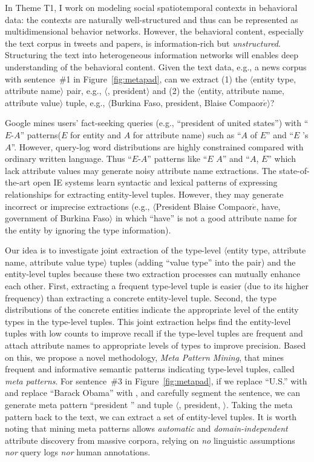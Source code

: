 \documentclass[10.5pt]{article}
\newcommand{\lb}{\mbox{$\langle$}}
\newcommand{\rb}{\mbox{$\rangle$}}
\newcommand{\pair}[2]{{\lb#1, #2\rb}\xspace}
\newcommand{\tuple}[3]{{\lb#1, #2, #3\rb}\xspace}
\newcommand{\eapatterns}{{``$E$-$A$'' patterns}\xspace}
\begin{document}
In Theme T1, I work on modeling social spatiotemporal contexts in behavioral data: the contexts are naturally well-structured and thus can be represented as multidimensional behavior networks. However, the behavioral content, especially the text corpus in tweets and papers, is information-rich but \textit{unstructured}. Structuring the text into heterogeneous information networks will enables deep understanding of the behavioral content. Given the text data, e.g., a news corpus with sentence~\#1 in Figure~\ref{fig:metapad}, can we extract (1) the \pair{entity type}{attribute name} pair, e.g., \pair{\cscountry}{president} and (2) the \tuple{entity}{attribute name}{attribute value} tuple, e.g., \tuple{Burkina Faso}{president}{Blaise Compaor$\acute{e}$}?

Google mines users' fact-seeking queries (e.g., ``president of united states'') with \eapatterns ($E$ for entity and $A$ for attribute name) such as ``$A$ of $E$'' and ``$E$ 's $A$''. However, query-log word distributions are highly constrained compared with ordinary written language. Thus \eapatterns like ``$E$ $A$'' and ``$A$, $E$'' which lack attribute values may generate noisy attribute name extractions. The state-of-the-art open IE systems learn syntactic and lexical patterns of expressing relationships for extracting entity-level tuples. However, they may generate incorrect or imprecise extractions (e.g., \tuple{President Blaise Compaor$\acute{e}$}{have}{government of Burkina Faso} in which ``have'' is not a good attribute name for the entity by ignoring the type information).

Our idea is to investigate joint extraction of the type-level \tuple{entity type}{attribute name}{attribute value type} tuples (adding ``value type'' into the pair) and the entity-level tuples because these two extraction processes can mutually enhance each other. First, extracting a frequent type-level tuple is easier (due to its higher frequency) than extracting a concrete entity-level tuple. Second, the type distributions of the concrete entities indicate the appropriate level of the entity types in the type-level tuples. This joint extraction helps find the entity-level tuples with low counts to improve recall if the type-level tuples are frequent and attach attribute names to appropriate levels of types to improve precision. Based on this, we propose a novel methodology, \textit{Meta Pattern Mining}, that mines frequent and informative semantic patterns indicating type-level tuples, called \textit{meta patterns}. For sentence~\#3 in Figure~\ref{fig:metapad}, if we replace ``U.S.'' with \cscountry and replace ``Barack Obama'' with \cspolitician, and carefully segment the sentence, we can generate meta pattern ``\cscountry president \cspolitician'' and tuple \tuple{\cscountry}{president}{\cspolitician}. Taking the meta pattern back to the text, we can extract a set of entity-level tuples. It is worth noting that mining meta patterns allows \textit{automatic} and \textit{domain-independent} attribute discovery from massive corpora, relying on \textit{no} linguistic assumptions \textit{nor} query logs \textit{nor} human annotations.
\end{document}
